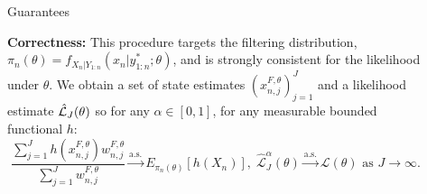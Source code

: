 \documentclass[final]{beamer}
\newcommand{\off}{\operatorname{off}}
\newcommand{\on}{\operatorname{on}}
\newcommand{\gX}{\mathcal{X}}
\newlength{\sepwidth}
\newlength{\colwidth}
\newcommand{\separatorcolumn}{\begin{column}{\sepwidth}\end{column}}
\begin{document}
\begin{frame}[t]
\begin{columns}[t]
\begin{column}{\colwidth}
    


\end{column}


\separatorcolumn

\begin{column}{\colwidth}

  \begin{alertblock}{Guarantees}

  \textbf{Correctness:} This procedure targets the filtering distribution, $\pi_n(\theta) = f_{X_n|Y_{1:n}}(x_n|y_{1:n}^*;\theta)$, and is strongly consistent for the likelihood under $\theta$. 
  We obtain a set of state estimates $(x_{n,j}^{F,\theta})_{j=1}^J$ and a likelihood estimate $\hat {\mathcal{L}}_J(\theta)$ so for any $\alpha\in[0,1]$, for any measurable bounded functional $h$:
  $$\frac{\sum_{j=1}^J h\left(x_{n, j}^{F, \theta}\right) w_{n, j}^{F, \theta}}{\sum_{j=1}^J w_{n, j}^{F, \theta}} \stackrel{\text{a.s.}}{\to} E_{\pi_n(\theta)}\left[h\left(X_n\right)\right], \; \hat{\mathcal{L}}_J^\alpha(\theta) \stackrel{\text{a.s.}}{\to} \mathcal{L}(\theta) \text{ as } J \to \infty.$$


\end{alertblock}
\end{column}
\end{columns}
\end{frame}
\end{document}
